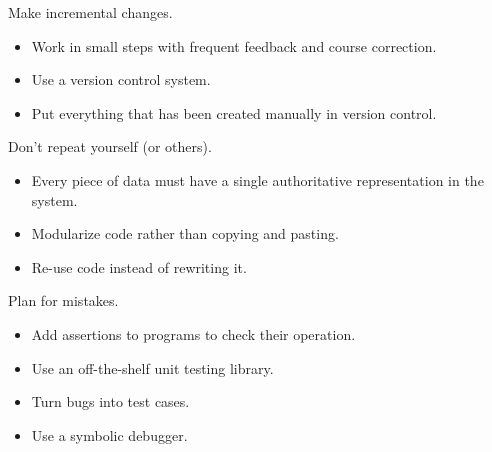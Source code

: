 \begin{frame}
\begin{cenumerate}
\item  Make incremental changes.\vspace{0.3cm}
	\begin{itemize}
	\item Work in small steps with frequent feedback and course correction. \vspace{0.2cm}
	\item  Use a version control system.\vspace{0.2cm}
	\item  Put everything that has been created manually in version control.
	\end{itemize}
\end{cenumerate}
\end{frame}

\begin{frame}
\begin{cenumerate}
\item Don't repeat yourself (or others).  \vspace{0.3cm}
	\begin{itemize}
	\item Every piece of data must have a single authoritative representation in the system. \vspace{0.2cm}
	\item  Modularize code rather than copying and pasting.\vspace{0.2cm}
	\item  Re-use code instead of rewriting it.
	\end{itemize}
\end{cenumerate}
\end{frame}

\begin{frame}
\begin{cenumerate}
\item  Plan for mistakes. \vspace{0.3cm}
	\begin{itemize}
	\item  Add assertions to programs to check their operation.\vspace{0.2cm}
	\item Use an off-the-shelf unit testing library.\vspace{0.2cm}
	\item  Turn bugs into test cases.\vspace{0.2cm}
	\item  Use a symbolic debugger.
	\end{itemize}
\end{cenumerate}
\end{frame}

